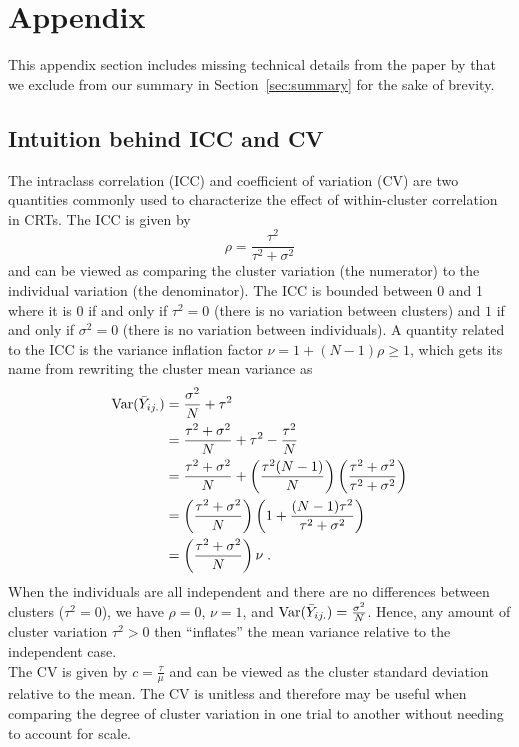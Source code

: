 \documentclass[10pt]{article}
\begin{document}
\newpage


\appendix
\section{Appendix} \label{apx}

This appendix section includes missing technical details from the paper by \textcite{Hussey:2007} that we exclude from our summary in Section~\ref{sec:summary} for the sake of brevity.

\subsection{Intuition behind ICC and CV} \label{apx:correlation}

The intraclass correlation (ICC) and coefficient of variation (CV) are two quantities commonly used to characterize the effect of within-cluster correlation in CRTs. The ICC is given by
\[
\rho = \frac{\tau^2}{\tau^2+\sigma^2}
\]
and can be viewed as comparing the cluster variation (the numerator) to the individual variation (the denominator). The ICC is bounded between 0 and 1 where it is 0 if and only if $\tau^2=0$ (there is no variation between clusters) and $1$ if and only if $\sigma^2=0$ (there is no variation between individuals). A quantity related to the ICC is the variance inflation factor $\nu=1+(N-1)\rho\geq1$, which gets its name from rewriting the cluster mean variance as
\begin{align*}
\mathrm{Var}(\bar{Y}_{ij.}) &= \frac{\sigma^2}{N} + \tau^2 \\
&= \frac{\tau^2+\sigma^2}{N} + \tau^2 - \frac{\tau^2}{N} \\
&= \frac{\tau^2+\sigma^2}{N} + \left(\frac{\tau^2(N-1)}{N}\right)\left(\frac{\tau^2+\sigma^2}{\tau^2+\sigma^2}\right) \\
&= \left(\frac{\tau^2+\sigma^2}{N}\right)\left(1+\frac{(N-1)\tau^2}{\tau^2+\sigma^2}\right) \\
&= \left(\frac{\tau^2+\sigma^2}{N}\right)\nu \;.
\end{align*}
When the individuals are all independent and there are no differences between clusters ($\tau^2=0$), we have $\rho=0$, $\nu=1$, and $\mathrm{Var}(\bar{Y}_{ij.})=\frac{\sigma^2}{N}$. Hence, any amount of cluster variation $\tau^2>0$ then ``inflates'' the mean variance relative to the independent case.
\\

The CV is given by $c=\frac{\tau}{\mu}$ and can be viewed as the cluster standard deviation relative to the mean. The CV is unitless and therefore may be useful when comparing the degree of cluster variation in one trial to another without needing to account for scale.
\end{document}
